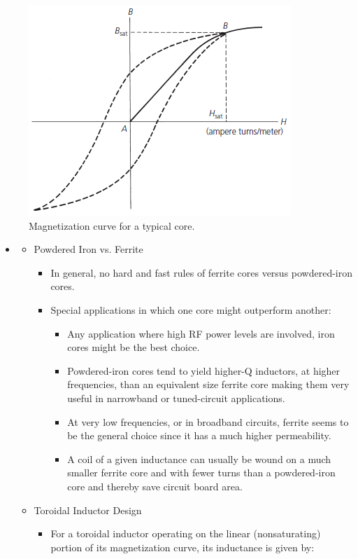 \begin{figure} [H]
	\centering
	\includegraphics[width=0.6\linewidth]{graphics/21.png}
	\caption{Magnetization curve for a typical core.}
	\label{fig:21}
\end{figure}

\begin{itemize}
	\item[]
	\begin{itemize}
		\item Powdered Iron vs. Ferrite
		\begin{itemize}
			\item In general, no hard and fast rules of ferrite cores versus powdered-iron cores.
			\item Special applications in which one core might outperform another:
			\begin{itemize}
				\item Any application where high RF power levels are involved, iron cores might be the best choice.
				\item Powdered-iron cores tend to yield higher-Q inductors,
				at higher frequencies, than an equivalent size ferrite core making them very useful in narrowband or tuned-circuit applications.
				\item At very low frequencies, or in broadband circuits, ferrite seems to be the	general choice since it has a much higher permeability.
				\item A coil of a given inductance can usually be wound on a
				much smaller ferrite core and with fewer turns than a powdered-iron core and thereby save circuit board area.
			\end{itemize}
		\end{itemize}
		\item Toroidal Inductor Design
		\begin{itemize}
			\item For a toroidal inductor operating on the linear (nonsaturating)	portion of its magnetization curve, its inductance is given by:
		\end{itemize}
	\end{itemize}
\end{itemize}

